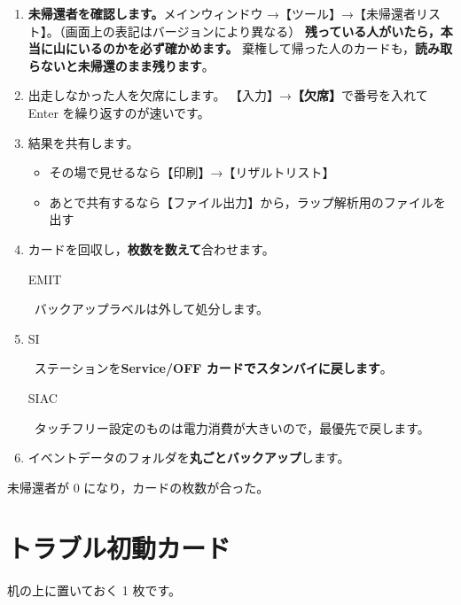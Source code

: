 \documentclass[a4paper,10pt]{ltjsarticle}
\DeclareRobustCommand{\tg}[2]{{\colorbox{#1}{\color{white}\sffamily\bfseries\scriptsize\strut #2}}}
\DeclareRobustCommand{\tSI}{\tg{cSI}{SI}}
\DeclareRobustCommand{\tEMIT}{\tg{cEMIT}{EMIT}}
\DeclareRobustCommand{\tSIAC}{\tg{cSIAC}{SIAC}}
\newcommand{\ver}{\textsf{\small（画面上の表記はバージョンにより異なる）}}
\begin{document}
\begin{enumerate}
\item \textbf{未帰還者を確認します。}メインウィンドウ →【ツール】→【未帰還者リスト】。\ver
      \textbf{残っている人がいたら，本当に山にいるのかを必ず確かめます。}
      棄権して帰った人のカードも，\textbf{読み取らないと未帰還のまま残ります}。
\item 出走しなかった人を欠席にします。
      【入力】→\textbf{【欠席】}で番号を入れて Enter を繰り返すのが速いです。
\item 結果を共有します。
  \begin{itemize}
  \item その場で見せるなら【印刷】→【リザルトリスト】
  \item あとで共有するなら【ファイル出力】から，ラップ解析用のファイルを出す
  \end{itemize}
\item カードを回収し，\textbf{枚数を数えて}合わせます。
      \tEMIT\ バックアップラベルは外して処分します。
\item \tSI\ ステーションを\textbf{Service/OFF カードでスタンバイに戻します}。
      \tSIAC\ タッチフリー設定のものは電力消費が大きいので，最優先で戻します。
\item イベントデータのフォルダを\textbf{丸ごとバックアップ}します。
\end{enumerate}

\begin{Done}
未帰還者が 0 になり，カードの枚数が合った。
\end{Done}

\clearpage
\section*{トラブル初動カード}

机の上に置いておく 1 枚です。
\end{document}
